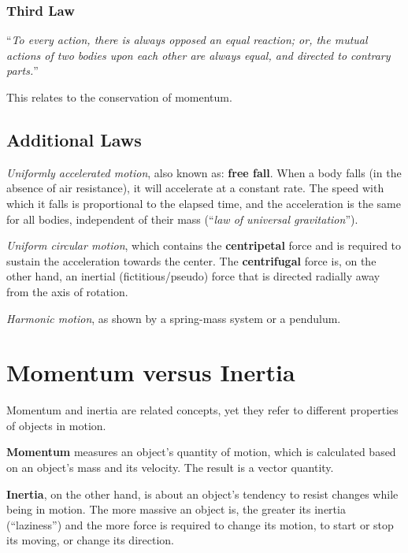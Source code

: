 \subsubsection{Third Law}

``\textit{To every action, there is always opposed an equal reaction; or, the mutual actions of two bodies upon each other are always equal, and directed to contrary parts.}''

This relates to the conservation of momentum.

\subsection{Additional Laws}\label{subsec:additional-laws}

\noindent \textit{Uniformly accelerated motion}, also known as: \textbf{free fall}.
When a body falls (in the absence of air resistance), it will accelerate at a constant rate.
The speed with which it falls is proportional to the elapsed time, and the acceleration is the same for all bodies, independent of their mass (``\textit{law of universal gravitation}'').

\vspace{5pt}
\noindent \textit{Uniform circular motion}, which contains the \textbf{centripetal} force and is required to sustain the acceleration towards the center.
The \textbf{centrifugal} force is, on the other hand, an inertial (fictitious/pseudo) force that is directed radially away from the axis of rotation.

\vspace{5pt}
\noindent \textit{Harmonic motion}, as shown by a spring-mass system or a pendulum.

\section{Momentum versus Inertia}\label{sec:momentum-versus-inertia}

Momentum and inertia are related concepts, yet they refer to different properties of objects in motion.

\textbf{Momentum} measures an object's quantity of motion, which is calculated based on an object's mass and its velocity.
The result is a vector quantity.

\textbf{Inertia}, on the other hand, is about an object's tendency to resist changes while being in motion.
The more massive an object is, the greater its inertia (``laziness'') and the more force is required to change its motion, to start or stop its moving, or change its direction.


